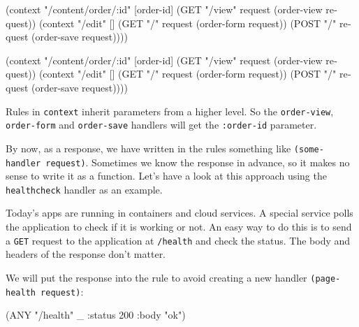 \ifx\DEVICETYPE\MOBILE

\begin{english}
  \begin{clojure}
(context "/content/order/:id" [order-id]
  (GET  "/view" request
        (order-view request))
  (context "/edit" []
    (GET  "/" request
          (order-form request))
    (POST "/" request
          (order-save request))))
  \end{clojure}
\end{english}

\else

\begin{english}
  \begin{clojure}
(context "/content/order/:id" [order-id]
  (GET  "/view" request (order-view request))
  (context "/edit" []
    (GET  "/" request (order-form request))
    (POST "/" request (order-save request))))
  \end{clojure}
\end{english}

\fi

Rules in \verb|context| inherit parameters from a higher level. So the \verb|order-view|, \verb|order-form| and \verb|order-save| handlers will get the \verb|:order-id| parameter.

By now, as a response, we have written in the rules something like \verb|(some-handler request)|. Sometimes we know the response in advance, so it makes no sense to write it as a function. Let's have a look at this approach using the \verb|healthcheck| handler as an example.

Today's apps are running in containers and cloud services.  A special service polls the application to check if it is working or not. An easy way to do this is to send a \verb|GET| request to the application at \verb|/health| and check the status. The body and headers of the response don't matter.

We will put the response into the rule to avoid creating a new handler \verb|(page-health request)|:


\ifx\DEVICETYPE\MOBILE

\begin{english}
  \begin{clojure}
(ANY "/health" _
     {:status 200 :body "ok"})
  \end{clojure}
\end{english}

\else

